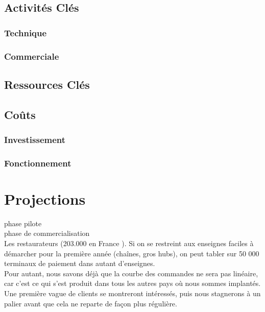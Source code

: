\subsection{Activités Clés}
\subsubsection{Technique}

\subsubsection{Commerciale}

\subsection{Ressources Clés}

\subsection{Coûts}
\subsubsection{Investissement}

\subsubsection{Fonctionnement}

\section{Projections}

phase pilote \\

phase de commercialisation \\

Les restaurateurs (203.000 en France ). Si on se restreint aux enseignes
faciles à démarcher pour la première année (chaînes, gros hubs), on peut tabler
sur 50 000 terminaux de paiement dans autant d’enseignes. \\

Pour autant, nous savons déjà que la courbe des commandes ne sera pas linéaire,
car c'est ce qui s'est produit dans tous les autres pays où nous sommes
implantés. Une première vague de clients se montreront intéressés, puis nous
stagnerons à un palier avant que cela ne reparte de façon plus régulière. \\

